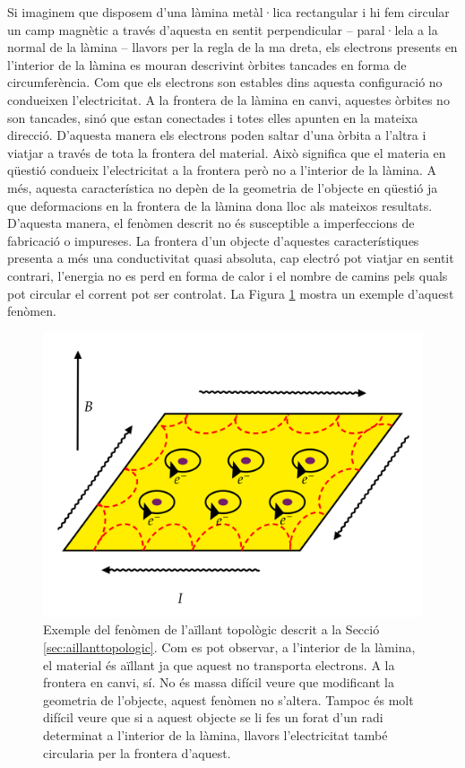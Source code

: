  Si imaginem que disposem d'una làmina metàl·lica rectangular i hi fem circular un camp magnètic a través d'aquesta en sentit perpendicular -- paral·lela a la normal de la làmina -- llavors per la regla de la ma dreta, els electrons presents en l'interior de la làmina es mouran descrivint òrbites tancades en forma de circumferència. Com que els electrons son estables dins aquesta configuració no condueixen l'electricitat. A la frontera de la làmina en canvi, aquestes òrbites no son tancades, sinó que estan conectades i totes elles apunten en la mateixa direcció. D'aquesta manera els electrons poden saltar d'una òrbita a l'altra i viatjar a través de tota la frontera del material. Això significa que el materia en qüestió condueix l'electricitat a la frontera però no a l'interior de la làmina. A més, aquesta característica no depèn de la geometria de l'objecte en qüestió ja que deformacions en la frontera de la làmina dona lloc als mateixos resultats. D'aquesta manera, el fenòmen descrit no és susceptible a imperfeccions de fabricació o impureses. La frontera d'un objecte d'aquestes característiques presenta a més una conductivitat quasi absoluta, cap electró pot viatjar en sentit contrari, l'energia no es perd en forma de calor i el nombre de camins pels quals pot circular el corrent pot ser controlat. La Figura \ref{fig:aillanttopologic} mostra un exemple d'aquest fenòmen.

\begin{figure}
	\centering
	\includegraphics[width=\linewidth]{img/aillant topologic.png}
	\caption{Exemple del fenòmen de l'aïllant topològic descrit a la Secció \ref{sec:aillanttopologic}. Com es pot observar, a l'interior de la làmina, el material és aïllant ja que aquest no transporta electrons. A la frontera en canvi, sí. No és massa difícil veure que modificant la geometria de l'objecte, aquest fenòmen no s'altera. Tampoc és molt difícil veure que si a aquest objecte se li fes un forat d'un radi determinat a l'interior de la làmina, llavors l'electricitat també circularia per la frontera d'aquest. }\label{fig:aillanttopologic}
\end{figure}

